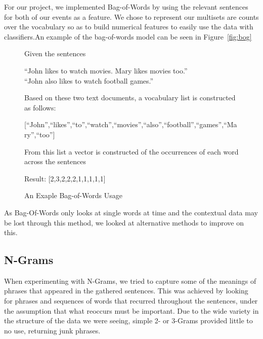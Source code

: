 \documentclass[bsc,frontabs,twoside,singlespacing,parskip,deptreport]{infthesis}     %
\begin{document}
For our project, we implemented Bag-of-Words by using the relevant sentences for both of our events as a feature.
We chose to represent our multisets are counts over the vocabulary so as to build numerical features to easily
use the data with classifiers.An example of the bag-of-words model can be seen in Figure~\ref{fig:bog}
\begin{figure}
\begin{tcolorbox}[width=\textwidth,
                  interior hidden,
                  boxsep=10pt,
                  left=0pt,
                  right=0pt,
                  top=2pt,
                  ]%
  Given the sentences \vspace{0.5em}\\
  \begin{center}``John likes to watch movies. Mary likes movies too.''\\
  ``John also likes to watch football games.''\vspace{1em}\\
   \end{center}
    Based on these two text documents, a vocabulary list is constructed as follows:\vspace{1em}\\
    \begin{center}
  [``John'',``likes'',``to'',``watch'',``movies'',``also'',``football'',``games'',``Mary'',``too'']\vspace{1em}\\
\end{center}
    From this list a vector is constructed of the occurrences
    of each word across the sentences\vspace{1em}\\
 \begin{center} 
  Result: [2,3,2,2,2,1,1,1,1,1]
\end{center}
\end{tcolorbox}
\caption{An Exaple Bag-of-Words Usage}
\label{fig:bow}
\end{figure}

As Bag-Of-Words only looks at single words at time and the contextual data may be lost through this method, we looked at
alternative methods to improve on this.

\subsection{N-Grams}
When experimenting with N-Grams, we tried to capture some of the meanings of phrases that appeared in the gathered
sentences.
This was achieved by looking for phrases and sequences of words that recurred throughout the sentences, under the assumption
that what reoccurs must be important. Due to the wide variety in the structure of the data we were seeing,
simple 2- or 3-Grams provided little to no use, returning junk phrases.
\end{document}
